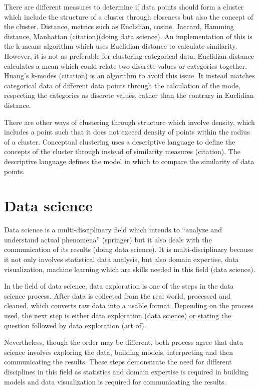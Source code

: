 There are different measures to determine if data points should form a cluster which include the structure of a cluster through closeness but also the concept of the cluster. Distance, metrics such as Euclidian, cosine, Jaccard, Hamming distance, Manhattan (citation)(doing data science). An implementation of this is the k-means algorithm which uses Euclidian distance to calculate similarity. However, it is not as preferable for clustering categorical data. Euclidian distance calculates a mean which could relate two discrete values or categories together. Huang’s k-modes (citation) is an algorithm to avoid this issue. It instead matches categorical data of different data points through the calculation of the mode, respecting the categories as discrete values, rather than the contrary in Euclidian distance. \par

There are other ways of clustering through structure which involve density, which includes a point such that it does not exceed density of points within the radius of a cluster. Conceptual clustering uses a descriptive language to define the concepts of the cluster through instead of similarity measures (citation). The descriptive language defines the model in which to compare the similarity of data points.\par

\section{Data science}
Data science is a multi-disciplinary field which intends to “analyze and understand actual phenomena” (springer) but it also deals with the communication of its results (doing data science). It is multi-disciplinary because it not only involves statistical data analysis, but also domain expertise, data visualization, machine learning which are skills needed in this field (data science).\par

In the field of data science, data exploration is one of the steps in the data science process. After data is collected from the real world, processed and cleaned, which converts raw data into a usable format. Depending on the process used, the next step is either data exploration (data science) or stating the question followed by data exploration (art of).\par

Nevertheless, though the order may be different, both process agree that data science involves exploring the data, building models, interpreting and then communicating the results. These steps demonstrate the need for different disciplines in this field as statistics and domain expertise is required in building models and data visualization is required for communicating the results.\par

